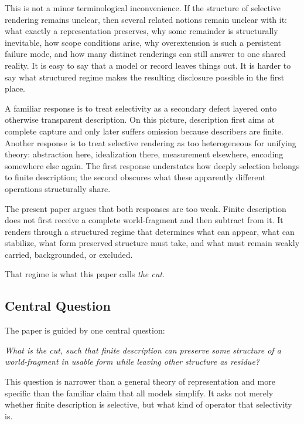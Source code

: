 \documentclass[11pt]{article}
\renewenvironment{quote}
  {\list{}{\leftmargin=1.4em \rightmargin=1.0em}%
   \item\relax\color{softink}\itshape}
  {\endlist}
\renewcommand{\emph}[1]{\textit{#1}}
\begin{document}
This is not a minor terminological inconvenience. If the structure of selective rendering remains unclear, then several related notions remain unclear with it: what exactly a representation preserves, why some remainder is structurally inevitable, how scope conditions arise, why overextension is such a persistent failure mode, and how many distinct renderings can still answer to one shared reality. It is easy to say that a model or record leaves things out. It is harder to say what structured regime makes the resulting disclosure possible in the first place.

A familiar response is to treat selectivity as a secondary defect layered onto otherwise transparent description. On this picture, description first aims at complete capture and only later suffers omission because describers are finite. Another response is to treat selective rendering as too heterogeneous for unifying theory: abstraction here, idealization there, measurement elsewhere, encoding somewhere else again. The first response understates how deeply selection belongs to finite description; the second obscures what these apparently different operations structurally share.

The present paper argues that both responses are too weak. Finite description does not first receive a complete world-fragment and then subtract from it. It renders through a structured regime that determines what can appear, what can stabilize, what form preserved structure must take, and what must remain weakly carried, backgrounded, or excluded.

That regime is what this paper calls \emph{the cut}.

\subsection{Central Question}

The paper is guided by one central question:

\begin{quote}
What is the cut, such that finite description can preserve some structure of a world-fragment in usable form while leaving other structure as residue?
\end{quote}

This question is narrower than a general theory of representation and more specific than the familiar claim that all models simplify. It asks not merely whether finite description is selective, but what kind of operator that selectivity is.
\end{document}
